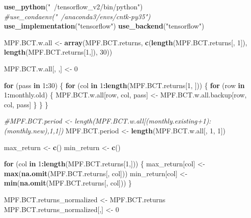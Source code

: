 \documentclass[]{article}
\newenvironment{Shaded}{\begin{snugshade}}{\end{snugshade}}
\newcommand{\CommentTok}[1]{\textcolor[rgb]{0.56,0.35,0.01}{\textit{#1}}}
\newcommand{\ControlFlowTok}[1]{\textcolor[rgb]{0.13,0.29,0.53}{\textbf{#1}}}
\newcommand{\DecValTok}[1]{\textcolor[rgb]{0.00,0.00,0.81}{#1}}
\newcommand{\KeywordTok}[1]{\textcolor[rgb]{0.13,0.29,0.53}{\textbf{#1}}}
\newcommand{\NormalTok}[1]{#1}
\newcommand{\OperatorTok}[1]{\textcolor[rgb]{0.81,0.36,0.00}{\textbf{#1}}}
\newcommand{\StringTok}[1]{\textcolor[rgb]{0.31,0.60,0.02}{#1}}
\begin{document}
\begin{Shaded}
\begin{Highlighting}[]
\KeywordTok{use_python}\NormalTok{(}\StringTok{"~/tensorflow_v2/bin/python"}\NormalTok{)}
\CommentTok{#use_condaenv("~/anaconda3/envs/cntk-py35")}
\KeywordTok{use_implementation}\NormalTok{(}\StringTok{"tensorflow"}\NormalTok{)}
\KeywordTok{use_backend}\NormalTok{(}\StringTok{"tensorflow"}\NormalTok{)}

\NormalTok{MPF.BCT.w.all <-}\StringTok{ }\KeywordTok{array}\NormalTok{(MPF.BCT.returns,}
                       \KeywordTok{c}\NormalTok{(}\KeywordTok{length}\NormalTok{(MPF.BCT.returns[, }\DecValTok{1}\NormalTok{]), }\KeywordTok{length}\NormalTok{(MPF.BCT.returns[}\DecValTok{1}\NormalTok{,]), }\DecValTok{30}\NormalTok{))}

\NormalTok{MPF.BCT.w.all[, ,] <-}\StringTok{ }\DecValTok{0}

\ControlFlowTok{for}\NormalTok{ (pass }\ControlFlowTok{in} \DecValTok{1}\OperatorTok{:}\DecValTok{30}\NormalTok{) \{}
  \ControlFlowTok{for}\NormalTok{ (col }\ControlFlowTok{in} \DecValTok{1}\OperatorTok{:}\KeywordTok{length}\NormalTok{(MPF.BCT.returns[}\DecValTok{1}\NormalTok{, ])) \{}
    \ControlFlowTok{for}\NormalTok{ (row }\ControlFlowTok{in} \DecValTok{1}\OperatorTok{:}\NormalTok{monthly.old) \{}
\NormalTok{      MPF.BCT.w.all[row, col, pass] <-}\StringTok{ }\NormalTok{MPF.BCT.w.all.backup[row, col, pass]}
\NormalTok{    \}}
\NormalTok{  \}}
\NormalTok{\}}

\CommentTok{#MPF.BCT.period <- length(MPF.BCT.w.all[(monthly.existing+1):(monthly.new),1,1])}
\NormalTok{MPF.BCT.period <-}\StringTok{ }\KeywordTok{length}\NormalTok{(MPF.BCT.w.all[, }\DecValTok{1}\NormalTok{, }\DecValTok{1}\NormalTok{])}

\NormalTok{max_return <-}\StringTok{ }\KeywordTok{c}\NormalTok{()}
\NormalTok{min_return <-}\StringTok{ }\KeywordTok{c}\NormalTok{()}

\ControlFlowTok{for}\NormalTok{ (col }\ControlFlowTok{in} \DecValTok{1}\OperatorTok{:}\KeywordTok{length}\NormalTok{(MPF.BCT.returns[}\DecValTok{1}\NormalTok{,])) \{}
\NormalTok{  max_return[col] <-}\StringTok{ }\KeywordTok{max}\NormalTok{(}\KeywordTok{na.omit}\NormalTok{(MPF.BCT.returns[, col]))}
\NormalTok{  min_return[col] <-}\StringTok{ }\KeywordTok{min}\NormalTok{(}\KeywordTok{na.omit}\NormalTok{(MPF.BCT.returns[, col]))}
\NormalTok{\}}

\NormalTok{MPF.BCT.returns_normalized <-}\StringTok{ }\NormalTok{MPF.BCT.returns}
\NormalTok{MPF.BCT.returns_normalized[,] <-}\StringTok{ }\DecValTok{0}


\end{Highlighting}
\end{Shaded}
\end{document}
